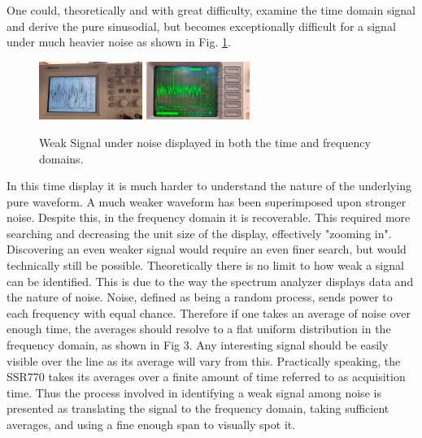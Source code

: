 \documentclass[prl,twocolumn,superscriptaddress,floatfix]{revtex4}
\begin{document}
One could, theoretically and with great difficulty, examine the time domain signal and derive the pure sinusodial, but
becomes exceptionally difficult for a signal under much heavier noise as shown in Fig. \ref{fig:2}. 

\begin{figure}[H]
    \begin{center}
    \includegraphics[width = 0.3\textwidth]{Time Data C.jpg}
    \includegraphics[width = 0.3\textwidth]{Signal C under Noise.jpg}
    \caption{\label{fig:2}Weak Signal under noise displayed in both the time and frequency domains.}
    \end{center}
\end{figure}

In this time display it is much harder to understand the nature of the underlying pure waveform.
A much weaker waveform has been superimposed upon stronger noise.
Despite this, in the frequency domain it is recoverable. 
This required more searching and decreasing the unit size of the display, effectively "zooming in".
Discovering an even weaker signal would require an even finer search, but would technically still be possible.
Theoretically there is no limit to how weak a signal can be identified.
This is due to the way the spectrum analyzer displays data and the nature of noise.
Noise, defined as being a  random process, sends power to each frequency with equal chance.
Therefore if one takes an average of noise over enough time, the averages should resolve to a flat uniform distribution in the frequency domain, as shown in Fig 3.
Any interesting signal should be easily visible over the line as its average will vary from this.
Practically speaking, the SSR770 takes its averages over a finite amount of time referred to as acquisition time.
Thus the process involved in identifying a weak signal among noise is presented as translating the signal to the frequency domain, taking sufficient averages, and using a fine enough span to visually spot it.
\end{document}

